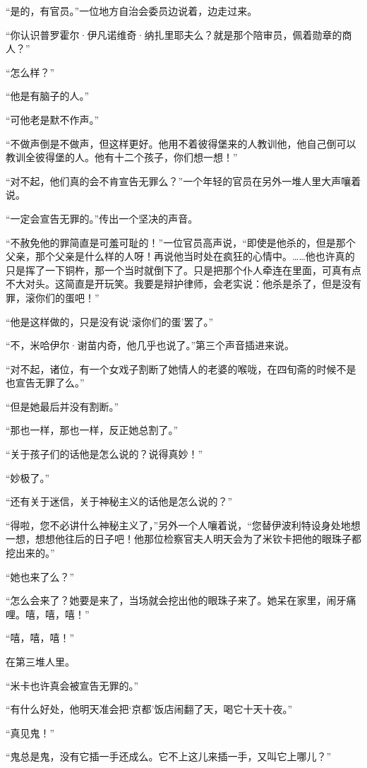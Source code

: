 \par “是的，有官员。”一位地方自治会委员边说着，边走过来。
\par “你认识普罗霍尔·伊凡诺维奇·纳扎里耶夫么？就是那个陪审员，佩着勋章的商人？”
\par “怎么样？”
\par “他是有脑子的人。”
\par “可他老是默不作声。”
\par “不做声倒是不做声，但这样更好。他用不着彼得堡来的人教训他，他自己倒可以教训全彼得堡的人。他有十二个孩子，你们想一想！”
\par “对不起，他们真的会不肯宣告无罪么？”一个年轻的官员在另外一堆人里大声嚷着说。
\par “一定会宣告无罪的。”传出一个坚决的声音。
\par “不赦免他的罪简直是可羞可耻的！”一位官员高声说，“即使是他杀的，但是那个父亲，那个父亲是什么样的人呀！再说他当时处在疯狂的心情中。……他也许真的只是挥了一下铜杵，那一个当时就倒下了。只是把那个仆人牵连在里面，可真有点不大对头。这简直是开玩笑。我要是辩护律师，会老实说：他杀是杀了，但是没有罪，滚你们的蛋吧！”
\par “他是这样做的，只是没有说‘滚你们的蛋’罢了。”
\par “不，米哈伊尔·谢苗内奇，他几乎也说了。”第三个声音插进来说。
\par “对不起，诸位，有一个女戏子割断了她情人的老婆的喉咙，在四旬斋的时候不是也宣告无罪了么。”
\par “但是她最后并没有割断。”
\par “那也一样，那也一样，反正她总割了。”
\par “关于孩子们的话他是怎么说的？说得真妙！”
\par “妙极了。”
\par “还有关于迷信，关于神秘主义的话他是怎么说的？”
\par “得啦，您不必讲什么神秘主义了，”另外一个人嚷着说，“您替伊波利特设身处地想一想，想想他往后的日子吧！他那位检察官夫人明天会为了米钦卡把他的眼珠子都挖出来的。”
\par “她也来了么？”
\par “怎么会来了？她要是来了，当场就会挖出他的眼珠子来了。她呆在家里，闹牙痛哩。嘻，嘻，嘻！”
\par “嘻，嘻，嘻！”
\par 在第三堆人里。
\par “米卡也许真会被宣告无罪的。”
\par “有什么好处，他明天准会把‘京都’饭店闹翻了天，喝它十天十夜。”
\par “真见鬼！”
\par “鬼总是鬼，没有它插一手还成么。它不上这儿来插一手，又叫它上哪儿？”

